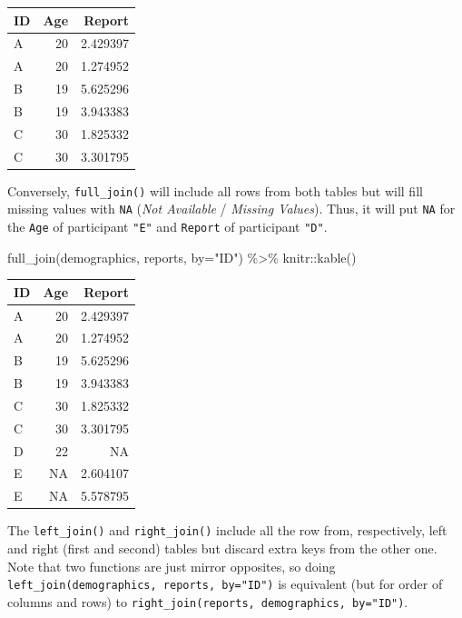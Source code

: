 \documentclass[
]{book}
\newenvironment{Shaded}{\begin{snugshade}}{\end{snugshade}}
\newcommand{\AttributeTok}[1]{\textcolor[rgb]{0.77,0.63,0.00}{#1}}
\newcommand{\FunctionTok}[1]{\textcolor[rgb]{0.00,0.00,0.00}{#1}}
\newcommand{\NormalTok}[1]{#1}
\newcommand{\SpecialCharTok}[1]{\textcolor[rgb]{0.00,0.00,0.00}{#1}}
\newcommand{\StringTok}[1]{\textcolor[rgb]{0.31,0.60,0.02}{#1}}
\begin{document}
\begin{tabular}{l|r|r}
\hline
ID & Age & Report\\
\hline
A & 20 & 2.429397\\
\hline
A & 20 & 1.274952\\
\hline
B & 19 & 5.625296\\
\hline
B & 19 & 3.943383\\
\hline
C & 30 & 1.825332\\
\hline
C & 30 & 3.301795\\
\hline
\end{tabular}

Conversely, \texttt{full\_join()} will include all rows from both tables but will fill missing values with \texttt{NA} (\emph{Not Available} / \emph{Missing Values}). Thus, it will put \texttt{NA} for the \texttt{Age} of participant \texttt{"E"} and \texttt{Report} of participant \texttt{"D"}.

\begin{Shaded}
\begin{Highlighting}[]
\FunctionTok{full\_join}\NormalTok{(demographics, reports, }\AttributeTok{by=}\StringTok{"ID"}\NormalTok{) }\SpecialCharTok{\%\textgreater{}\%}
\NormalTok{  knitr}\SpecialCharTok{::}\FunctionTok{kable}\NormalTok{()}
\end{Highlighting}
\end{Shaded}

\begin{tabular}{l|r|r}
\hline
ID & Age & Report\\
\hline
A & 20 & 2.429397\\
\hline
A & 20 & 1.274952\\
\hline
B & 19 & 5.625296\\
\hline
B & 19 & 3.943383\\
\hline
C & 30 & 1.825332\\
\hline
C & 30 & 3.301795\\
\hline
D & 22 & NA\\
\hline
E & NA & 2.604107\\
\hline
E & NA & 5.578795\\
\hline
\end{tabular}

The \texttt{left\_join()} and \texttt{right\_join()} include all the row from, respectively, left and right (first and second) tables but discard extra keys from the other one. Note that two functions are just mirror opposites, so doing \texttt{left\_join(demographics,\ reports,\ by="ID")} is equivalent (but for order of columns and rows) to \texttt{right\_join(reports,\ demographics,\ by="ID")}.
\end{document}

